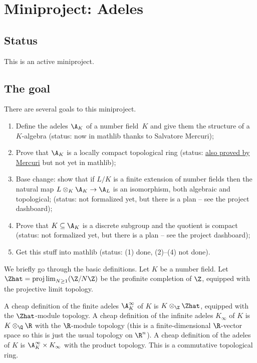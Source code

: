 \chapter{Miniproject: Adeles}\label{Adele_miniproject}

\section{Status}

This is an active miniproject.

\section{The goal}

There are several goals to this miniproject.

\begin{enumerate}
  \item Define the adeles $\A_K$ of a number field~$K$ and
    give them the structure of a $K$-algebra (status: now in mathlib thanks to
    Salvatore Mercuri);
  \item Prove that $\A_K$ is a locally compact topological ring (status:
      \href{https://github.com/smmercuri/adele-ring_locally-compact}{
      also proved by Mercuri} but not yet in mathlib);
  \item Base change: show that if $L/K$ is a finite extension of number fields then the
    natural map $L\otimes_K\A_K\to\A_L$ is an isomorphism, both algebraic and
    topological; (status: not
    formalized yet, but there is a plan -- see the project dashboard);
  \item Prove that $K \subseteq \A_K$ is a discrete subgroup and the quotient
    is compact (status: not formalized yet, but there is a plan -- see the project
    dashboard);
  \item Get this stuff into mathlib (status: (1) done, (2)--(4) not done).
\end{enumerate}

We briefly go through the basic definitions. Let $K$ be a number field.
Let $\Zhat=\projlim_{N\geq1}(\Z/N\Z)$ be the profinite completion of $\Z$,
equipped with the projective limit topology.

A cheap definition of the finite adeles $\A_K^\infty$ of $K$ is $K\otimes_{\Z}\Zhat$,
equipped with the $\Zhat$-module topology.
A cheap definition of the infinite adeles
$K_\infty$ of $K$ is $K\otimes_{\Q}\R$ with the $\R$-module topology (this is a
finite-dimensional $\R$-vector space so this is just the usual topology on $\R^n$).
A cheap definition of the adeles of $K$ is $\A_K^\infty\times K_\infty$ with
the product topology. This is a commutative topological ring.

